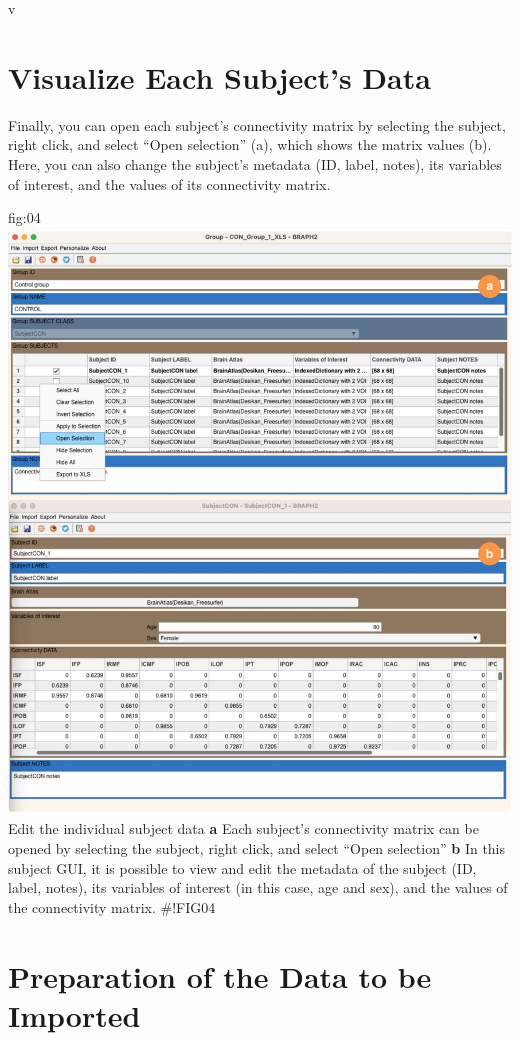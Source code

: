 v\documentclass[justified]{tufte-handout}
\begin{document}
\section{Visualize Each Subject's Data}

Finally, you can open each subject's connectivity matrix by selecting the subject, right click, and select ``Open selection'' (a), which shows the matrix values (b). Here, you can also change the subject's metadata (ID, label, notes), its variables of interest, and the values of its connectivity matrix.

	{fig:04}
	{\includegraphics{fig04.jpg}
	}
	{Edit the individual subject data}
	{
	{\bf a}  Each subject's connectivity matrix can be opened by selecting the subject, right click, and select ``Open selection''
	{\bf b} In this subject GUI, it is possible to view and edit the metadata of the subject (ID, label, notes), its variables of interest (in this case, age and sex), and the values of the connectivity matrix. 
	}
#!FIG04

\clearpage
\section{Preparation of the Data to be Imported}
\end{document}
